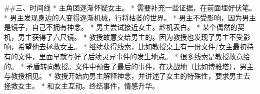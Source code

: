 ##三、时间线
* 主角团逐渐怀疑女主。
	* 需要补充一些证据，在前面埋好伏笔。
* 男主发现身边的人变得逐渐机械，行将枯萎的世界。
	* 男主不受影响，因为男主是镜子，自己不拥有神念。
* 男主尝试接近女主。趁机表白。
* 某个偶然的契机，男主获得了六尺镜。
	* 教授故意交给男主的。因为教授也发现了男主不受影响，希望他去拯救女主。
* 继续获得线索，比如教授桌上有一份文件/女主最初持有的文件，里面早就写好了后续灵异事件的发生地点。
	* 很多线索是教授故意给的。
* 矛盾转向教授。文件中预告了最后的事件，在决战地（比如博雅塔），男主与教授相见。
* 教授开始向男主解释神念，并讲述了女主的特殊性，要求男主去拯救女主。
* 和女主互动。终结事件，情感升华。